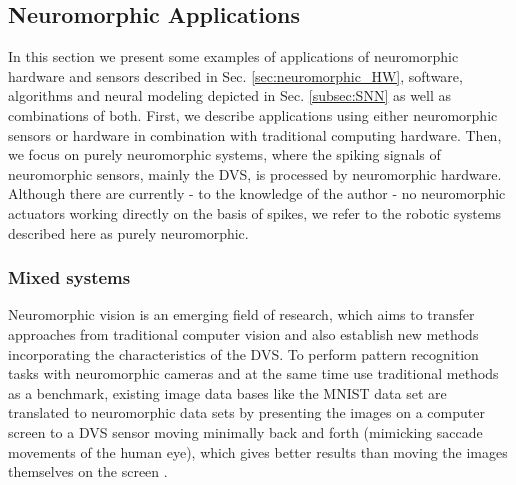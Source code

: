 \subsection{Neuromorphic Applications}
\label{subsec:neuro_applic}

In this section we present some examples of applications of neuromorphic hardware and sensors described in Sec. \ref{sec:neuromorphic_HW}, software, algorithms and neural modeling depicted in Sec. \ref{subsec:SNN} as well as combinations of both.
First, we describe applications using either neuromorphic sensors or hardware in combination with traditional computing hardware.
Then, we focus on purely neuromorphic systems, where the spiking signals of neuromorphic sensors, mainly the \ac{DVS}, is processed by neuromorphic hardware.
Although there are currently - to the knowledge of the author - no neuromorphic actuators working directly on the basis of spikes, we refer to the robotic systems described here as purely neuromorphic.

\subsubsection{Mixed systems}
\label{subsubsec:mixed_sys}

Neuromorphic vision \parencite{Tan2015} is an emerging field of research, which aims to transfer approaches from traditional computer vision and also establish new methods incorporating the characteristics of the \ac{DVS}.
To perform pattern recognition tasks with neuromorphic cameras and at the same time use traditional methods as a benchmark, existing image data bases like the \ac{MNIST} data set \parencite{LeCun1998} are translated to neuromorphic data sets by presenting the images on a computer screen to a \ac{DVS} sensor moving minimally back and forth \parencite{Orchard2015} (mimicking saccade movements of the human eye), which gives better results than moving the images themselves on the screen \parencite{Serrano-Gotarredona2013}.

